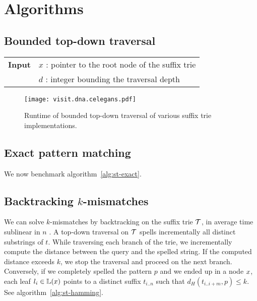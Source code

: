 \section{Algorithms}

\subsection{Bounded top-down traversal}

\begin{center}
\begin{minipage}[t]{.7\textwidth}
\begin{algorithm}[H]
\begin{tabular}{ll}
\textbf{Input}  & $x$ : pointer to the root node of the suffix trie\\
 			    & $d$ : integer bounding the traversal depth\\
\end{tabular}
\begin{algorithmic}[1]
		\Repeat
			\State {}
		\Until {}
	\EndIf
\EndIf
\end{algorithmic}
\label{alg:st-dfs}
\end{algorithm}
\end{minipage}
\end{center}

\begin{figure}[h]
\begin{center}
\caption[Top-down traversal runtime]{Runtime of bounded top-down traversal of various suffix trie implementations.}
\label{fig:visit-dna}
\texttt{[image: visit.dna.celegans.pdf]}
\end{center}
\end{figure}

\subsection{Exact pattern matching}

We now benchmark algorithm~\ref{alg:st-exact}.

\subsection{Backtracking $k$-mismatches}

We can solve $k$-mismatches by backtracking \citep{Ukkonen1993, Baeza1999} on the suffix trie $\mathcal {T}$, in average time sublinear in $n$ \citep{Navarro2000}.
A top-down traversal on $\mathcal {T}$ spells incrementally all distinct substrings of $t$.
While traversing each branch of the trie, we incrementally compute the distance between the query and the spelled string.
If the computed distance exceeds $k$, we stop the traversal and proceed on the next branch.
Conversely, if we completely spelled the pattern $p$ and we ended up in a node $x$, each leaf $l_i \in \mathbb {L}(x)$ points to a distinct suffix $t_{i..n}$ such that $d_H(t_{i..i+m}, p) \leq k$.
See algorithm~\ref{alg:st-hamming}.

